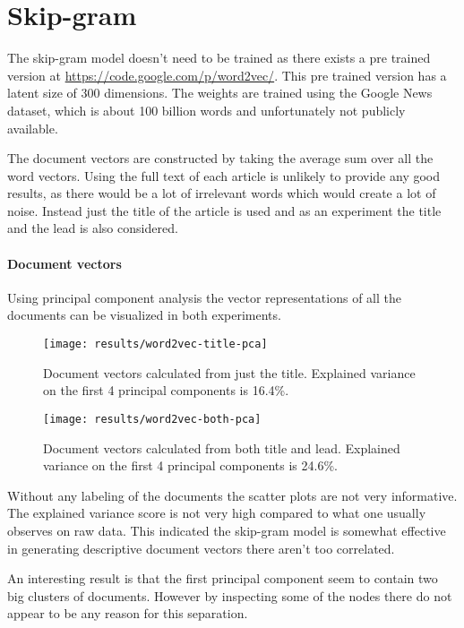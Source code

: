 \section{Skip-gram}

The skip-gram model doesn't need to be trained as there exists a pre trained version at \url{https://code.google.com/p/word2vec/}. This pre trained version has a latent size of 300 dimensions. The weights are trained using the Google News dataset, which is about 100 billion words and unfortunately not publicly available.

The document vectors are constructed by taking the average sum over all the word vectors. Using the full text of each article is unlikely to provide any good results, as there would be a lot of irrelevant words which would create a lot of noise. Instead just the title of the article is used and as an experiment the title and the lead is also considered.

\paragraph{Document vectors} Using principal component analysis the vector representations of all the documents can be visualized in both experiments.
\begin{figure}[H]
	\centering
	\texttt{[image: results/word2vec-title-pca]}
	\caption{Document vectors calculated from just the title. Explained variance on the first 4 principal components is 16.4\%.}
\end{figure}

\begin{figure}[H]
	\centering
	\texttt{[image: results/word2vec-both-pca]}
	\caption{Document vectors calculated from both title and lead. Explained variance on the first 4 principal components is 24.6\%.}
\end{figure}

Without any labeling of the documents the scatter plots are not very informative. The explained variance score is not very high compared to what one usually observes on raw data. This indicated the skip-gram model is somewhat effective in generating descriptive document vectors there aren't too correlated.

An interesting result is that the first principal component seem to contain two big clusters of documents. However by inspecting some of the nodes there do not appear to be any reason for this separation.

